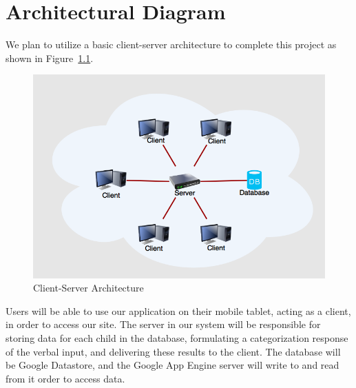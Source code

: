 \chapter{Architectural Diagram}

We plan to utilize a basic client-server architecture to complete this project as shown in Figure~\ref{fig:arch}.

\begin{figure}[htb]
\centering
\includegraphics[width=\textwidth]{arch.png}
\caption{Client-Server Architecture}
\label{fig:arch}
\end{figure}

Users will be able to use our application on their mobile tablet, acting as a client, in order to access our site. The server in our system will be responsible for storing data for each child in the database, formulating a categorization response of the verbal input, and delivering these results to the client. The database will be Google Datastore, and the Google App Engine server will write to and read from it order to access data.